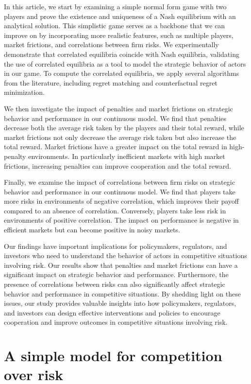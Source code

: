 \documentclass[preprint,12pt,authoryear]{elsarticle}
\theoremstyle{definition}
\begin{document}
In this article, we start by examining a simple normal form game with two players and prove the existence and uniqueness of a Nash equilibrium with an analytical solution. This simplistic game serves as a backbone that we can improve on by incorporating more realistic features, such as multiple players, market frictions, and correlations between firm risks. We experimentally demonstrate that correlated equilibria coincide with Nash equilibria, validating the use of correlated equilibria as a tool to model the strategic behavior of actors in our game. To compute the correlated equilibria, we apply several algorithms from the literature, including regret matching and counterfactual regret minimization.

We then investigate the impact of penalties and market frictions on strategic behavior and performance in our continuous model. We find that penalties decrease both the average risk taken by the players and their total reward, while market frictions not only decrease the average risk taken but also increase the total reward. Market frictions have a greater impact on the total reward in high-penalty environments. In particularly inefficient markets with high market frictions, increasing penalties can improve cooperation and the total reward.

Finally, we examine the impact of correlations between firm risks on strategic behavior and performance in our continuous model. We find that players take more risks in environments of negative correlation, which improves their payoff compared to an absence of correlation. Conversely, players take less risk in environments of positive correlation. The impact on performance is negative in efficient markets but can become positive in noisy markets.

Our findings have important implications for policymakers, regulators, and investors who need to understand the behavior of actors in competitive situations involving risk. Our results show that penalties and market frictions can have a significant impact on strategic behavior and performance. Furthermore, the presence of correlations between risks can also significantly affect strategic behavior and performance in competitive situations. By shedding light on these issues, our study provides valuable insights into how policymakers, regulators, and investors can design effective interventions and policies to encourage cooperation and improve outcomes in competitive situations involving risk.


\section{A simple model for competition over risk}
\label{sec:simplemodel}
\end{document}
